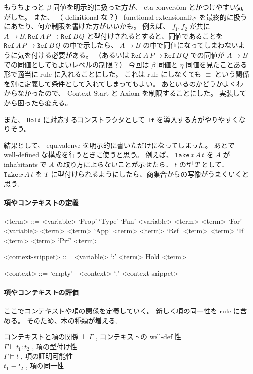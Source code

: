 もうちょっと \(\beta\) 同値を明示的に扱った方が、 eta-conversion とかつけやすい気がした。
また、 （ definitional な？） functional extensionality を最終的に扱うにあたり、何か制限を書けた方がいいかも。
例えば、 \(f_1 , f_2\) が共に \(A \to B , \texttt{Ref} \, A \, P \to \texttt{Ref} \, B \, Q\) と型付けされるとすると、同値であることを \(\texttt{Ref} \, A \, P \to \texttt{Ref} \, B \, Q\) の中で示したら、 \(A \to B\) の中で同値になってしまわないように気を付ける必要がある。
（あるいは \(\texttt{Ref} \, A \, P \to \texttt{Ref} \, B \, Q\) での同値が \(A \to B\) での同値としてもよいレベルの制限？）
今回は \(\beta\) 同値と \(\eta\) 同値を見たことある形で適当に rule に入れることにした。
これは rule にしなくても \(\equiv\) という関係を別に定義して条件として入れてしまってもよい。
あといるのかどうかよくわからなかったので、 Context Start と Axiom を制限することにした。
実装してから困ったら変える。

また、 \(\texttt{Hold}\) に対応するコンストラクタとして \(\texttt{If}\) を導入する方がやりやすくなりそう。

結果として、 equivalenve を明示的に書いただけになってしまった。
あとで well-defined な構成を行うときに使うと思う。
例えば、 \(\texttt{Take} \, x \, A \, t\) を \(A\) が inhabitants で \(A\) の取り方によらないことが示せたら、 \(t\) の型 \(T\) として、 \(\texttt{Take} \, x \, A \, t\) を \(T\) に型付けられるようにしたら、商集合からの写像がうまくいくと思う。

\paragraph*{項やコンテキストの定義}
\begin{grammar}
<term> ::= <variable> 
\alt `Prop'
\alt `Type'
\alt `Fun' <variable> <term> <term>
\alt `For' <variable> <term> <term>
\alt `App' <term> <term>
\alt `Ref' <term> <term>
\alt `If' <term> <term>
\alt `Prf' <term>

<context-snippet> ::= <variable> `:' <term>
\alt Hold <term>

<context> ::= `empty' | <context> `,' <context-snippet>
\end{grammar}

\paragraph*{項やコンテキストの評価}
ここでコンテキストや項の関係を定義していく。
新しく項の同一性を rule に含める。
そのため、木の種類が増える。

\begin{itembox}[l]{コンテキストと項の関係}
  \(\vdash \Gamma\) , コンテキストの well-def 性 \\
  \(\Gamma \vdash t_1 : t_2\) , 項の型付け性 \\
  \(\Gamma \vDash t\) , 項の証明可能性 \\
  \(t_1 \equiv t_2\) , 項の同一性
\end{itembox}

